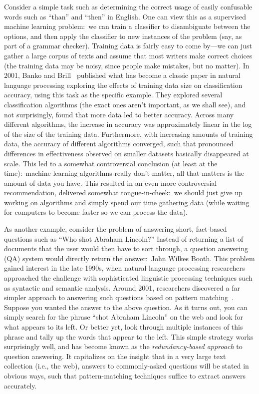 Consider a simple task such as determining the correct usage of easily
confusable words such as ``than'' and ``then'' in English.  One can
view this as a supervised machine learning problem:\ we can train a
classifier to disambiguate between the options, and then apply the
classifier to new instances of the problem (say, as part of a grammar
checker).  Training data is fairly easy to come by---we can just
gather a large corpus of texts and assume that most writers make
correct choices (the training data may be noisy, since people make
mistakes, but no matter).  In 2001, Banko and Brill~\cite{Banko01}
published what has become a classic paper in natural language
processing exploring the effects of training data size on
classification accuracy, using this task as the specific example.
They explored several classification algorithms (the exact ones aren't
important, as we shall see), and not surprisingly, found that more
data led to better accuracy.  Across many different algorithms, the
increase in accuracy was approximately linear in the log of the size
of the training data.  Furthermore, with increasing amounts of
training data, the accuracy of different algorithms converged, such
that pronounced differences in effectiveness observed on smaller
datasets basically disappeared at scale.  This led to a somewhat
controversial conclusion (at least at the time):\ machine learning
algorithms really don't matter, all that matters is the amount of data
you have.  This resulted in an even more controversial recommendation,
delivered somewhat tongue-in-cheek:\ we should just give up working on
algorithms and simply spend our time gathering data (while waiting for
computers to become faster so we can process the data).

As another example, consider the problem of answering short,
fact-based questions such as ``Who shot Abraham Lincoln?''  Instead of
returning a list of documents that the user would then have to sort
through, a question answering (QA) system would directly return the
answer:\ John Wilkes Booth.  This problem gained interest in the late
1990s, when natural language processing researchers approached the
challenge with sophisticated linguistic processing techniques such as
syntactic and semantic analysis.  Around 2001, researchers discovered
a far simpler approach to answering such questions based on pattern
matching~\cite{Brill_etal_TREC2001,Dumais_etal_SIGIR2002,Lin_TOIS2007}.
Suppose you wanted the answer to the above question.  As it turns out,
you can simply search for the phrase ``shot Abraham Lincoln'' on the
web and look for what appears to its left.  Or better yet, look
through multiple instances of this phrase and tally up the words that
appear to the left.  This simple strategy works surprisingly well, and
has become known as the \emph{redundancy-based approach} to question
answering.  It capitalizes on the insight that in a very large text
collection (i.e., the web), answers to commonly-asked questions will
be stated in obvious ways, such that pattern-matching techniques
suffice to extract answers accurately.

